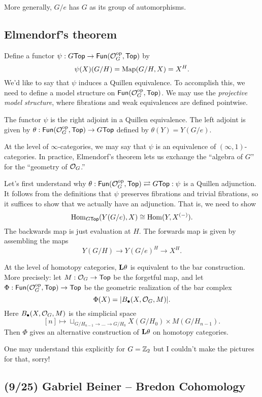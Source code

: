 \documentclass{article}
\begin{document}
More generally, $G/e$ has $G$ as its group of automorphisms.

\subsection{Elmendorf's theorem}

Define a functor $\psi: G\mathsf{Top} \to \mathsf{Fun}(\mathcal{O}_G^{\mathrm{op}}, \mathsf{Top})$ by 
\[
  \psi(X)(G/H) = \operatorname{Map}(G/H, X) = X^H.
\]
We'd like to say that $\psi$ induces a Quillen equivalence.
To accomplish this, we need to define a model structure on $\mathsf{Fun}(\mathcal{O}_G^{\mathrm{op}}, \mathsf{Top})$.
We may use the \emph{projective model structure}, where fibrations and weak equivalences are defined pointwise.

\begin{thm}[Elmendorf]
  The functor $\psi$ is the right adjoint in a Quillen equivalence.
  The left adjoint is given by $\theta: \mathsf{Fun}(\mathcal{O}_G^{\mathrm{op}}, \mathsf{Top}) \to G\mathsf{Top}$ defined by $\theta(Y) = Y(G / e)$.
\end{thm}

At the level of $\infty$-categories, we may say that $\psi$ is an equivalence of $(\infty, 1)$-categories.
In practice, Elmendorf's theorem lets us exchange the ``algebra of $G$'' for the ``geometry of $\mathcal{O}_G$.''

Let's first understand why $\theta: \mathsf{Fun}(\mathcal{O}_G^{\mathrm{op}}, \mathsf{Top}) \rightleftarrows G\mathsf{Top} :\psi$ is a Quillen adjunction.
It follows from the definitions that $\psi$ preserves fibrations and trivial fibrations, so it suffices to show that we actually have an adjunction.
That is, we need to show
\[
  \operatorname{Hom}_{G\mathsf{Top}}(Y(G/e), X) \cong \operatorname{Hom}(Y, X^{(-)}).
\]
The backwards map is just evaluation at $H$.
The forwards map is given by assembling the maps
\[
  Y(G/H) \to Y(G/e)^H \to X^H.
\]

At the level of homotopy categories, $\mathbf{L} \theta$ is equivalent to the bar construction.
More precisely: let $M: \mathcal{O}_G \to \mathsf{Top}$ be the forgetful map, and let $\Phi: \mathsf{Fun}(\mathcal{O}_G^{\mathrm{op}}, \mathsf{Top}) \to \mathsf{Top}$ be the geometric realization of the bar complex
\[
  \Phi(X) = |B_\bullet(X, \mathcal{O}_G, M)|.
\]
Here $B_\bullet(X, \mathcal{O}_G, M)$ is the simplicial space
\[
  [n] \mapsto \sqcup_{G / H_{n-1} \to \dots \to G / H_0} X(G / H_0) \times M(G / H_{n-1}).
\]
Then $\Phi$ gives an alternative construction of $\mathbf{L} \theta$ on homotopy categories.

One may understand this explicitly for $G = \mathbb{Z}_2$ but I couldn't make the pictures for that, sorry!

\subsection{(9/25) Gabriel Beiner -- Bredon Cohomology}
\end{document}

